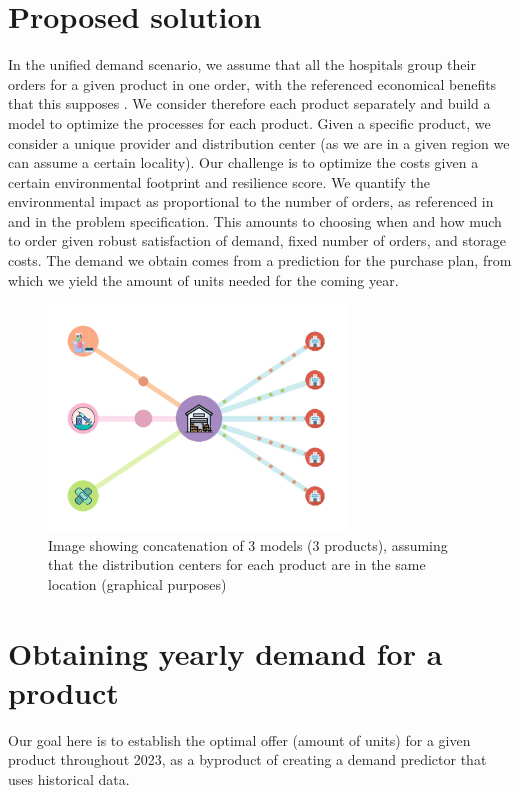 \documentclass[11pt,twocolumn]{article}
\begin{document}
\section{Proposed solution}\label{sec3}
In the unified demand scenario, we assume that all the hospitals group their orders for a given product in one order, with the referenced economical benefits that this supposes \cite{key2}. We consider therefore each product separately and build a model to optimize the processes for each product. Given a specific product, we consider a unique provider and distribution center (as we are in a given region we can assume a certain locality). Our challenge is to optimize the costs given a certain environmental footprint and resilience score. We quantify the environmental impact as proportional to the number of orders, as referenced in \cite{key1} and in the problem specification. This amounts to choosing when and how much to order given robust satisfaction of demand, fixed number of orders, and storage costs.
The demand we obtain comes from a prediction for the purchase plan, from which we yield the amount of units needed for the coming year. 

\begin{figure}
    \centering
    \includegraphics[width=8cm]{WhatsApp Image 2023-11-12 at 01.28.21.jpeg}
    \caption{Image showing concatenation of 3 models (3 products), assuming that the distribution centers for each product are in the same location (graphical purposes)}
    \label{fig:enter-label}
\end{figure}

\section{Obtaining yearly demand for a product}
Our goal here is to establish the optimal offer (amount of units) for a given product throughout 2023, as a byproduct of creating a demand predictor that uses historical data.
\end{document}
